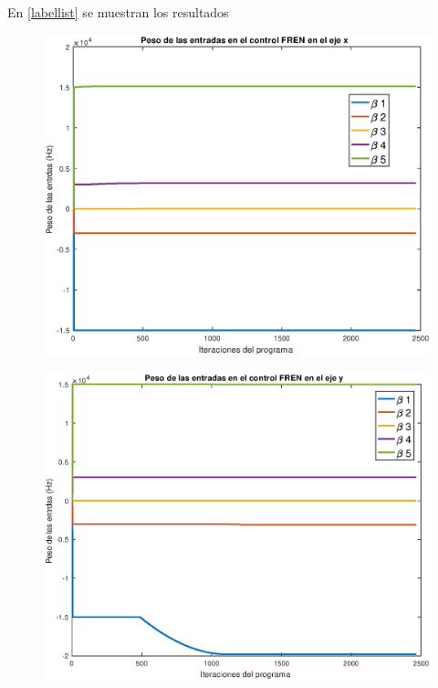 En  \cref{labellist} se muestran los resultados











\begin{figure}
	\centering
	\includegraphics[width=1\linewidth]{visio/graficasderesultados/betasx1}
	\caption{}
	\label{fig:betasx1}
\end{figure}
\begin{figure}
	\centering
	\includegraphics[width=1\linewidth]{visio/graficasderesultados/betasy1}
	\caption{}
	\label{fig:betasy1}
\end{figure}
